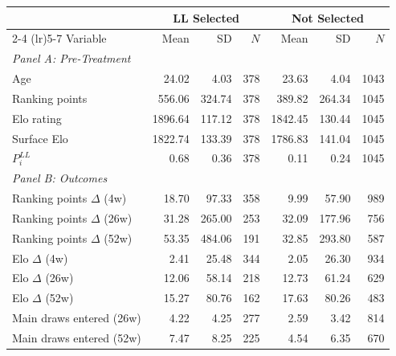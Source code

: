 \begin{tabular}{p{4cm} rrr rrr}
\toprule
 & \multicolumn{3}{c}{LL Selected} & \multicolumn{3}{c}{Not Selected} \\
\cmidrule(lr){2-4} \cmidrule(lr){5-7}
Variable & Mean & SD & $N$ & Mean & SD & $N$ \\
\midrule
\multicolumn{7}{l}{\textit{Panel A: Pre-Treatment}} \\
\quad Age & 24.02 & 4.03 & 378 & 23.63 & 4.04 & 1043 \\
\quad Ranking points & 556.06 & 324.74 & 378 & 389.82 & 264.34 & 1045 \\
\quad Elo rating & 1896.64 & 117.12 & 378 & 1842.45 & 130.44 & 1045 \\
\quad Surface Elo & 1822.74 & 133.39 & 378 & 1786.83 & 141.04 & 1045 \\
\quad $P_i^{LL}$ & 0.68 & 0.36 & 378 & 0.11 & 0.24 & 1045 \\
\midrule
\multicolumn{7}{l}{\textit{Panel B: Outcomes}} \\
\quad Ranking points $\Delta$ (4w) & 18.70 & 97.33 & 358 & 9.99 & 57.90 & 989 \\
\quad Ranking points $\Delta$ (26w) & 31.28 & 265.00 & 253 & 32.09 & 177.96 & 756 \\
\quad Ranking points $\Delta$ (52w) & 53.35 & 484.06 & 191 & 32.85 & 293.80 & 587 \\
\quad Elo $\Delta$ (4w) & 2.41 & 25.48 & 344 & 2.05 & 26.30 & 934 \\
\quad Elo $\Delta$ (26w) & 12.06 & 58.14 & 218 & 12.73 & 61.24 & 629 \\
\quad Elo $\Delta$ (52w) & 15.27 & 80.76 & 162 & 17.63 & 80.26 & 483 \\
\quad Main draws entered (26w) & 4.22 & 4.25 & 277 & 2.59 & 3.42 & 814 \\
\quad Main draws entered (52w) & 7.47 & 8.25 & 225 & 4.54 & 6.35 & 670 \\
\bottomrule
\end{tabular}
